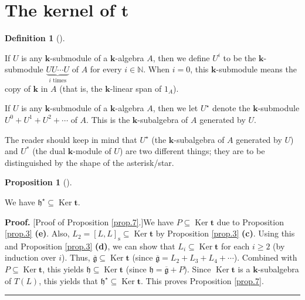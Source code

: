 \documentclass[numbers=enddot,12pt,final,onecolumn,notitlepage]{scrartcl}%
\theoremstyle{definition}
\newtheorem{prop}[theo]{Proposition}
\newenvironment{proposition}[1][]
{\begin{prop}[#1]\begin{leftbar}}
{\end{leftbar}\end{prop}}
\newtheorem{defi}[theo]{Definition}
\newenvironment{definition}[1][]
{\begin{defi}[#1]\begin{leftbar}}
{\end{leftbar}\end{defi}}
\newenvironment{proof}[1][Proof]{\noindent\textbf{#1.} }{\ \rule{0.5em}{0.5em}}
\begin{document}
\section{The kernel of $\mathbf{t}$}

\begin{definition}
If $U$ is any $\mathbf{k}$-submodule of a $\mathbf{k}$-algebra $A$, then we
define $U^{i}$ to be the $\mathbf{k}$-submodule $\underbrace{UU\cdots
U}_{i\text{ times}}$ of $A$ for every $i\in\mathbb{N}$. When $i=0$, this
$\mathbf{k}$-submodule means the copy of $\mathbf{k}$ in $A$ (that is, the
$\mathbf{k}$-linear span of $1_{A}$).

If $U$ is any $\mathbf{k}$-submodule of a $\mathbf{k}$-algebra $A$, then we
let $U^{\star}$ denote the $\mathbf{k}$-submodule $U^{0}+U^{1}+U^{2}+\cdots$
of $A$. This is the $\mathbf{k}$-subalgebra of $A$ generated by $U$.
\end{definition}

The reader should keep in mind that $U^{\star}$ (the $\mathbf{k}$-subalgebra
of $A$ generated by $U$) and $U^{\ast}$ (the dual $\mathbf{k}$-module of $U$)
are two different things; they are to be distinguished by the shape of the asterisk/star.

\begin{proposition}
\label{prop.7}We have $\mathfrak{h}^{\star}\subseteq\operatorname*{Ker}%
\mathbf{t}$.
\end{proposition}

\begin{proof}
[Proof of Proposition \ref{prop.7}.]We have $P\subseteq\operatorname*{Ker}%
\mathbf{t}$ due to Proposition \ref{prop.3} \textbf{(e)}. Also, $L_{2}=\left[
L,L\right]  _{\operatorname*{s}}\subseteq\operatorname*{Ker}\mathbf{t}$ by
Proposition \ref{prop.3} \textbf{(c)}. Using this and Proposition \ref{prop.3}
\textbf{(d)}, we can show that $L_{i}\subseteq\operatorname*{Ker}\mathbf{t}$
for each $i\geq2$ (by induction over $i$). Thus, $\overline{\mathfrak{g}%
}\subseteq\operatorname*{Ker}\mathbf{t}$ (since $\overline{\mathfrak{g}}%
=L_{2}+L_{3}+L_{4}+\cdots$). Combined with $P\subseteq\operatorname*{Ker}%
\mathbf{t}$, this yields $\mathfrak{h}\subseteq\operatorname*{Ker}\mathbf{t}$
(since $\mathfrak{h}=\overline{\mathfrak{g}}+P$). Since $\operatorname*{Ker}%
\mathbf{t}$ is a $\mathbf{k}$-subalgebra of $T\left(  L\right)  $, this yields
that $\mathfrak{h}^{\star}\subseteq\operatorname*{Ker}\mathbf{t}$. This proves
Proposition \ref{prop.7}.
\end{proof}
\end{document}
